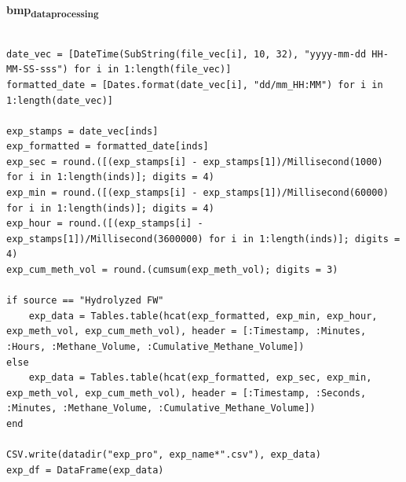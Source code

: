 \documentclass[11pt]{article}
\begin{document}
\textbf{bmp\textsubscript{data}\textsubscript{processing}}
\begin{verbatim}

date_vec = [DateTime(SubString(file_vec[i], 10, 32), "yyyy-mm-dd HH-MM-SS-sss") for i in 1:length(file_vec)]
formatted_date = [Dates.format(date_vec[i], "dd/mm_HH:MM") for i in 1:length(date_vec)]

exp_stamps = date_vec[inds]
exp_formatted = formatted_date[inds]
exp_sec = round.([(exp_stamps[i] - exp_stamps[1])/Millisecond(1000) for i in 1:length(inds)]; digits = 4)
exp_min = round.([(exp_stamps[i] - exp_stamps[1])/Millisecond(60000) for i in 1:length(inds)]; digits = 4)
exp_hour = round.([(exp_stamps[i] - exp_stamps[1])/Millisecond(3600000) for i in 1:length(inds)]; digits = 4)
exp_cum_meth_vol = round.(cumsum(exp_meth_vol); digits = 3)

if source == "Hydrolyzed FW"
    exp_data = Tables.table(hcat(exp_formatted, exp_min, exp_hour, exp_meth_vol, exp_cum_meth_vol), header = [:Timestamp, :Minutes, :Hours, :Methane_Volume, :Cumulative_Methane_Volume])
else
    exp_data = Tables.table(hcat(exp_formatted, exp_sec, exp_min, exp_meth_vol, exp_cum_meth_vol), header = [:Timestamp, :Seconds, :Minutes, :Methane_Volume, :Cumulative_Methane_Volume])
end

CSV.write(datadir("exp_pro", exp_name*".csv"), exp_data)
exp_df = DataFrame(exp_data)

\end{verbatim}
\end{document}

